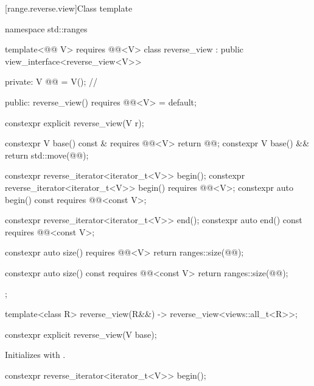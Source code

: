 [range.reverse.view]{Class template }

%
%
%
\begin{codeblock}
namespace std::ranges {
  template<@@ V>
    requires @@<V>
  class reverse_view : public view_interface<reverse_view<V>> {
  private:
    V @@ = V();  // \expos

  public:
    reverse_view() requires @@<V> = default;

    constexpr explicit reverse_view(V r);

    constexpr V base() const & requires @@<V> { return @@; }
    constexpr V base() && { return std::move(@@); }

    constexpr reverse_iterator<iterator_t<V>> begin();
    constexpr reverse_iterator<iterator_t<V>> begin() requires @@<V>;
    constexpr auto begin() const requires @@<const V>;

    constexpr reverse_iterator<iterator_t<V>> end();
    constexpr auto end() const requires @@<const V>;

    constexpr auto size() requires @@<V> {
      return ranges::size(@@);
    }

    constexpr auto size() const requires @@<const V> {
      return ranges::size(@@);
    }
  };

  template<class R>
    reverse_view(R&&) -> reverse_view<views::all_t<R>>;
}
\end{codeblock}

%
\begin{itemdecl}
constexpr explicit reverse_view(V base);
\end{itemdecl}

\begin{itemdescr}
\pnum
\effects
Initializes  with .
\end{itemdescr}

%
\begin{itemdecl}
constexpr reverse_iterator<iterator_t<V>> begin();
\end{itemdecl}

